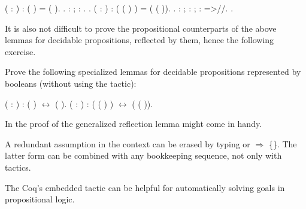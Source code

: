 \begin{coqdoccode}
\coqdocemptyline
\coqdocnoindent
{}  ( : ) : (  ) = (  ).\coqdoceol
\coqdocnoindent
{}.  : ; : . .\coqdoceol
\coqdocemptyline
\coqdocnoindent
{}  (  : ) : ( (  ) ) = (  (  )).\coqdoceol
\coqdocnoindent
{}.  : ; : ; : =>//. .\coqdoceol
\coqdocemptyline
\end{coqdoccode}


It is also not difficult to prove the propositional counterparts of
the above lemmas for decidable propositions, reflected by them, hence
the following exercise.


\begin{exercise}


Prove the following specialized lemmas for decidable propositions
represented by booleans (without using the  tactic):


\begin{coqdoccode}
\coqdocemptyline
\coqdocnoindent
{}  ( : ) : (  ) \ensuremath{\leftrightarrow} (  ).\coqdoceol
\coqdocemptyline
\coqdocnoindent
{}  (  : ) : ( (  ) ) \ensuremath{\leftrightarrow} (  (  )).\coqdoceol
\coqdocemptyline
\end{coqdoccode}


\hint In the proof of  the generalized reflection lemma
  might come in handy.


\hint A redundant assumption  in the context can be erased by
 typing    or  \ensuremath{\Rightarrow} \{\}. The latter form can
 be combined with any bookkeeping sequence, not only with 
 tactics.


\hint The Coq's embedded tactic  can be helpful for
 automatically solving goals in propositional logic.


\end{exercise}


